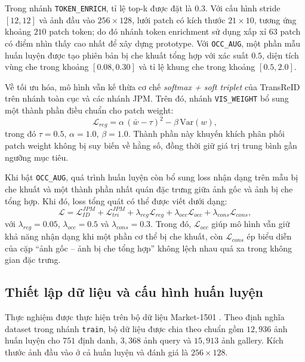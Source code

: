 Trong nhánh \texttt{TOKEN\_ENRICH}, tỉ lệ top-k được đặt là $0.3$. Với cấu hình
stride $[12,12]$ và ảnh đầu vào $256 \times 128$, lưới patch có kích thước
$21 \times 10$, tương ứng khoảng $210$ patch token; do đó nhánh token
enrichment sử dụng xấp xỉ $63$ patch có điểm nhìn thấy cao nhất để xây dựng
prototype. Với \texttt{OCC\_AUG}, một phần mẫu huấn luyện được tạo phiên bản bị
che khuất tổng hợp với xác suất $0.5$, diện tích vùng che trong khoảng
$[0.08, 0.30]$ và tỉ lệ khung che trong khoảng $[0.5, 2.0]$.

Về tối ưu hóa, mô hình vẫn kế thừa cơ chế \textit{softmax + soft triplet} của
TransReID trên nhánh toàn cục và các nhánh JPM. Trên đó, nhánh
\texttt{VIS\_WEIGHT} bổ sung một thành phần điều chuẩn cho patch weight:
\begin{equation}
\mathcal{L}_{reg}
= \alpha \, (\bar{w} - \tau)^2 - \beta \, \mathrm{Var}(w),
\end{equation}
trong đó $\tau = 0.5$, $\alpha = 1.0$, $\beta = 1.0$. Thành phần này khuyến
khích phân phối patch weight không bị suy biến về hằng số, đồng thời giữ giá trị
trung bình gần ngưỡng mục tiêu.

Khi bật \texttt{OCC\_AUG}, quá trình huấn luyện còn bổ sung loss nhận dạng trên
mẫu bị che khuất và một thành phần nhất quán đặc trưng giữa ảnh gốc và ảnh bị
che tổng hợp. Khi đó, loss tổng quát có thể được viết dưới dạng:
\begin{equation}
\mathcal{L}
= \mathcal{L}_{ID}^{JPM}
+ \mathcal{L}_{tri}^{JPM}
+ \lambda_{reg}\mathcal{L}_{reg}
+ \lambda_{occ}\mathcal{L}_{occ}
+ \lambda_{cons}\mathcal{L}_{cons},
\end{equation}
với $\lambda_{reg} = 0.05$, $\lambda_{occ} = 0.5$ và $\lambda_{cons} = 0.3$.
Trong đó, $\mathcal{L}_{occ}$ giúp mô hình vẫn giữ khả năng nhận dạng khi một
phần cơ thể bị che khuất, còn $\mathcal{L}_{cons}$ ép biểu diễn của cặp
``ảnh gốc -- ảnh bị che tổng hợp'' không lệch nhau quá xa trong không gian đặc
trưng.

\subsection{Thiết lập dữ liệu và cấu hình huấn luyện}
Thực nghiệm được thực hiện trên bộ dữ liệu Market-1501
\cite{zheng2015market1501}. Theo định nghĩa dataset trong nhánh
\texttt{train}, bộ dữ liệu được chia theo chuẩn gồm $12{,}936$ ảnh huấn luyện
cho $751$ định danh, $3{,}368$ ảnh query và $15{,}913$ ảnh gallery. Kích thước
ảnh đầu vào ở cả huấn luyện và đánh giá là $256 \times 128$.

